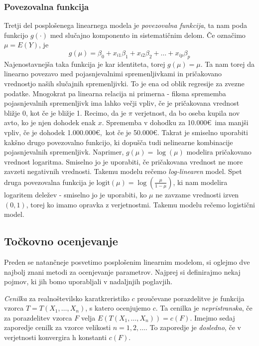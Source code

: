 \documentclass[12pt,a4paper]{amsart}
\theoremstyle{definition} %
\theoremstyle{plain} %
\begin{document}
\subsubsection{Povezovalna funkcija}
Tretji del posplošenega linearnega modela je \textit{povezovalna funkcija}, ta nam poda funkcijo $g(\cdot)$ med slučajno komponento
in sistematičnim delom. Če označimo $\mu = E(Y)$, je
\[
    g(\mu) = \beta_{0} + x_{i1}\beta_{1} + x_{i2}\beta_{2} + \ldots + x_{ip}\beta_{p}
\]
Najenostavnejša taka funkcija je kar identiteta, torej $g(\mu) = \mu$. Ta nam torej da linearno povezavo med pojasnjevalnimi spremenljivkami 
in pričakovano vrednostjo naših slučajnih spremenljivki. To je ena od oblik regresije za zvezne podatke.
Mnogokrat pa linearna relacija ni primerna - fiksna sprememba pojasnjevalnih spremenljivk ima lahko večji vpliv, če je pričakovana vrednost 
bližje 0, kot če je bližje 1. Recimo, da je $\pi$ verjetnost, da bo oseba kupila nov avto, ko je njen dohodek enak $x$. Sprememba v dohodku
za 10.000\euro~ima manjši vpliv, če je dohodek 1.000.000\euro,~kot če je 50.000\euro.
Takrat je smiselno uporabiti kakšno drugo povezovalno funkcijo, ki dopušča tudi nelinearne kombinacije pojasnjevalnih
spremenljivk. Naprimer, $g(\mu) = \log(\mu)$ modelira
pričakovano vrednost logaritma. Smiselno jo je uporabiti, če pričakovana vrednost ne more zavzeti negativnih vrednosti. Takemu modelu rečemo
\textit{log-linearen} model.
Spet druga povezovalna funkcija je $\mathrm{logit}(\mu) = \log(\frac{\mu}{1-\mu})$, ki nam modelira logaritem deležev - smiselno jo je uporabiti, 
ko $\mu$ ne zavzame vrednosti izven $(0,1)$, torej ko imamo opravka z verjetnostmi. Takemu modelu rečemo logistični model.
\subsection{Točkovno ocenjevanje}
Preden se natančneje posvetimo posplošenim linearnim modelom, si oglejmo dve najbolj znani metodi za ocenjevanje parametrov.
Najprej si definirajmo nekaj pojmov, ki jih bomo uporabljali v nadaljnjih poglavjih.

\textit{Cenilka} za realnoštevilsko karatkreristiko $c$ proučevane porazdelitve je funkcija vzorca $T=T(X_{1},\ldots,X_{n})$, s katero ocenjujemo $c.$
Ta cenilka je \textit{nepristranska}, če za porazdelitev vzorca $F$ velja $E(T(X_{1},\ldots,X_{n})) = c(F).$
Imejmo sedaj zaporedje cenilk za vzorce velikosti $n=1,2,\ldots.$ To zaporedje je \textit{dosledno}, če v verjetnosti konvergira h konstanti $c(F).$
\end{document}
